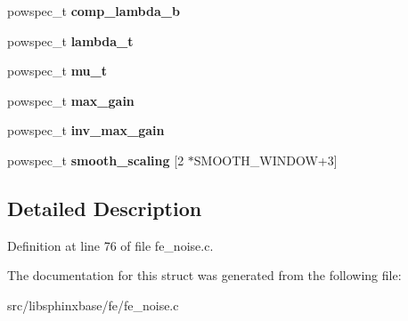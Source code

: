 \begin{DoxyCompactItemize}
\item 
powspec\-\_\-t {\bfseries comp\-\_\-lambda\-\_\-b}\label{structnoise__stats__s_ac3317afbf629cadc04b41c5657f0140d}

\item 
powspec\-\_\-t {\bfseries lambda\-\_\-t}\label{structnoise__stats__s_a94d5961c9df8d3345821c2f6c4358514}

\item 
powspec\-\_\-t {\bfseries mu\-\_\-t}\label{structnoise__stats__s_ad5cc76a830669ea5fbf0b8f4e4f80652}

\item 
powspec\-\_\-t {\bfseries max\-\_\-gain}\label{structnoise__stats__s_afeda1bf01ce753f6b3e4fb89279cfc63}

\item 
powspec\-\_\-t {\bfseries inv\-\_\-max\-\_\-gain}\label{structnoise__stats__s_ab6b62f1324e05bafa461bdcab8bc1bf3}

\item 
powspec\-\_\-t {\bfseries smooth\-\_\-scaling} [2 $\ast$S\-M\-O\-O\-T\-H\-\_\-\-W\-I\-N\-D\-O\-W+3]\label{structnoise__stats__s_a4bc8cd91479f20703fdf82251ba90e6e}

\end{DoxyCompactItemize}


\subsection{Detailed Description}


Definition at line 76 of file fe\-\_\-noise.\-c.



The documentation for this struct was generated from the following file\-:\begin{DoxyCompactItemize}
\item 
src/libsphinxbase/fe/fe\-\_\-noise.\-c\end{DoxyCompactItemize}
